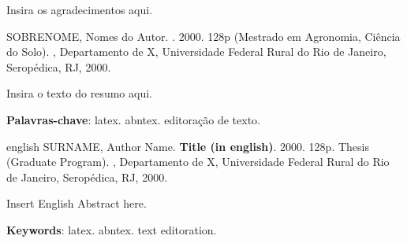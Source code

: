 \documentclass[
	12pt,				%
	openany,			%
	twoside,			%
	a4paper,			%
	chapter=TITLE,		%
	english,			%
	brazil				%
	]{abntex2}
\begin{document}
\begin{agradecimentos}
Insira os agradecimentos aqui.

\end{agradecimentos}



\setlength{\absparsep}{18pt} %
\begin{resumo}
SOBRENOME, Nomes do Autor. \textbf{\imprimirtitulo}.
2000. 128p \imprimirtipotrabalho{} (Mestrado em Agronomia, Ciência do Solo). \imprimirinstituto, Departamento de X, Universidade Federal Rural do Rio de Janeiro, Seropédica, RJ, 2000.

Insira o texto do resumo aqui.

\textbf{Palavras-chave}: latex. abntex. editoração de texto.
\end{resumo}

\begin{resumo}[Abstract]
 \begin{otherlanguage*}{english}
   SURNAME, Author Name. \textbf{Title (in english)}. 2000. 128p. Thesis (Graduate Program). \imprimirinstituto, Departamento de X, Universidade Federal Rural do Rio de Janeiro, Seropédica, RJ, 2000.
   
   Insert English Abstract here.

   \vspace{\onelineskip}
 
   \noindent 
   \textbf{Keywords}: latex. abntex. text editoration.
 \end{otherlanguage*}
\end{resumo}
\end{document}
